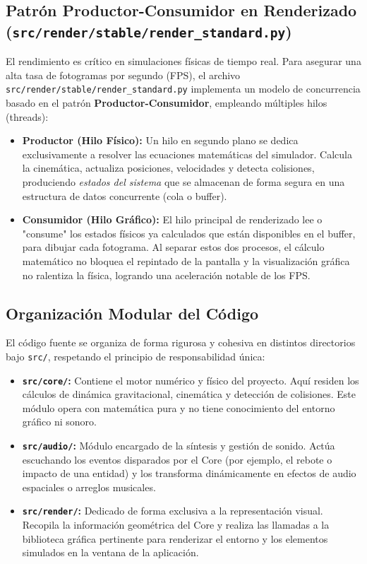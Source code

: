 \documentclass[12pt]{book}
\begin{document}
\subsection{Patrón Productor-Consumidor en Renderizado (\texttt{src/render/stable/render\_standard.py})}
El rendimiento es crítico en simulaciones físicas de tiempo real. Para asegurar una alta tasa de fotogramas por segundo (FPS), el archivo \texttt{src/render/stable/render\_standard.py} implementa un modelo de concurrencia basado en el patrón \textbf{Productor-Consumidor}, empleando múltiples hilos (threads):

\begin{itemize}
    \item \textbf{Productor (Hilo Físico):} Un hilo en segundo plano se dedica exclusivamente a resolver las ecuaciones matemáticas del simulador. Calcula la cinemática, actualiza posiciones, velocidades y detecta colisiones, produciendo \textit{estados del sistema} que se almacenan de forma segura en una estructura de datos concurrente (cola o buffer).
    \item \textbf{Consumidor (Hilo Gráfico):} El hilo principal de renderizado lee o "consume" los estados físicos ya calculados que están disponibles en el buffer, para dibujar cada fotograma. Al separar estos dos procesos, el cálculo matemático no bloquea el repintado de la pantalla y la visualización gráfica no ralentiza la física, logrando una aceleración notable de los FPS.
\end{itemize}

\subsection{Organización Modular del Código}
El código fuente se organiza de forma rigurosa y cohesiva en distintos directorios bajo \texttt{src/}, respetando el principio de responsabilidad única:

\begin{itemize}
    \item \textbf{\texttt{src/core/}:} Contiene el motor numérico y físico del proyecto. Aquí residen los cálculos de dinámica gravitacional, cinemática y detección de colisiones. Este módulo opera con matemática pura y no tiene conocimiento del entorno gráfico ni sonoro.
    \item \textbf{\texttt{src/audio/}:} Módulo encargado de la síntesis y gestión de sonido. Actúa escuchando los eventos disparados por el Core (por ejemplo, el rebote o impacto de una entidad) y los transforma dinámicamente en efectos de audio espaciales o arreglos musicales.
    \item \textbf{\texttt{src/render/}:} Dedicado de forma exclusiva a la representación visual. Recopila la información geométrica del Core y realiza las llamadas a la biblioteca gráfica pertinente para renderizar el entorno y los elementos simulados en la ventana de la aplicación.
\end{itemize}
\end{document}
